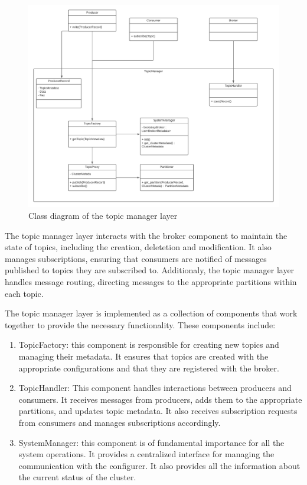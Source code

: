 \begin{figure}[H]
    \centering
    \includegraphics[width=1.0\textwidth]{Figures/class_diagram_topic_manager.png}
    \caption{Class diagram of the topic manager layer}
    \label{fig:class_diagram_topic_manager}
\end{figure}

The topic manager layer interacts with the broker component to maintain the
state of topics, including the creation, deletetion and modification.
It also manages subscriptions, ensuring that consumers are notified of messages
published to topics they are subscribed to. Additionaly, the topic manager
layer handles message routing, directing messages to the appropriate partitions
within each topic.

The topic manager layer is implemented as a collection of components that work
together to provide the necessary functionality. These components include:

\begin{enumerate}
    \item   TopicFactory: this component is responsible for creating new
            topics and managing their metadata. It ensures that topics are
            created with the appropriate configurations and that they are
            registered with the broker.
    \item   TopicHandler: This component handles interactions between producers
            and consumers. It receives messages from producers, adds them to
            the appropriate partitions, and updates topic metadata. It also
            receives subscription requests from consumers and manages
            subscriptions accordingly.
    \item   SystemManager: this component is of fundamental importance for all
            the system operations. It provides a centralized interface for
            managing the communication with the configurer. It also provides
            all the information about the current status of the cluster.
\end{enumerate}

